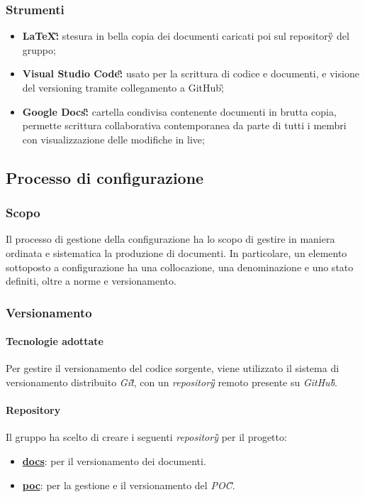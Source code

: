 			\subsubsection{Strumenti}
			\begin{itemize}
				\item \textbf{\LaTeX\G:} stesura in bella copia dei documenti caricati poi sul repository\G{} del gruppo;
				\item \textbf{Visual Studio Code\G:} usato per la scrittura di codice e documenti, e visione del versioning tramite collegamento a GitHub\G;
				\item \textbf{Google Docs\G:} cartella condivisa contenente documenti in brutta copia, permette scrittura collaborativa contemporanea da parte di tutti i membri con visualizzazione delle modifiche in live;
			\end{itemize}

	\subsection{Processo di configurazione}
	\subsubsection{Scopo}
		Il processo di gestione della configurazione ha lo scopo di gestire in maniera ordinata e sistematica la produzione di documenti. %
		 In particolare, un elemento sottoposto a configurazione ha una collocazione, una denominazione e uno stato definiti, oltre a norme e versionamento. 
 	
	\subsubsection{Versionamento}
		\paragraph*{Tecnologie adottate}
		\aCapo{}  
			Per gestire il versionamento del codice sorgente, viene utilizzato il sistema di versionamento distribuito \emph{Git\G}, con un \emph{repository\G{}} remoto presente su \emph{GitHub\G}.
			
		\paragraph*{Repository}
		\aCapo{}
			Il gruppo \teamname{} ha scelto di creare i seguenti \emph{repository\G{}} per il progetto:
			\begin{itemize}
				\item \href{https://github.com/Bug-s-Bunny-Team/docs}{\textbf{docs}}: per il versionamento dei documenti.
				\item \href{https://github.com/Bug-s-Bunny-Team/poc}{\textbf{poc}}: per la gestione e il versionamento del \textit{POC\G}.
			\end{itemize}

